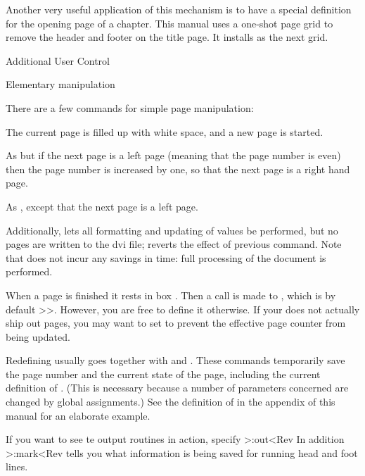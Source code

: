 Another very useful application of this mechanism is to have a
special definition for the opening page of a chapter. This manual uses a
one-shot page grid  to remove the header and footer on the
title page. It installs  as the next grid.

\Section Additional User Control

\SubSection Elementary manipulation

There are a few commands for simple page manipulation:
\Description\item {}
The current page is filled up with white space, and
a new page is started.\item {}
As  but if the next page is a left page (meaning
that the page number is even) then the page number is increased by
one, so that the next page is a right hand page.\item {}
As , except that the next page is a left page.
\>

Additionally,  lets
all formatting and updating of values be performed, but
no pages are written to the dvi file;
reverts the effect of previous command. Note that  does not
incur any savings in time: full processing of the document is performed.
 
When a page is finished it rests in box . Then a call is
made  to , which is by default
\ver>\shipout\box\WholePage>. However, you are free to define it
otherwise. If your  does not actually ship out pages,
you may want to set  to prevent the effective page
counter from being updated.

Redefining  usually goes together with
 and . These commands
temporarily save the page number and the current state of the page,
including the current definition of . (This is necessary
because a number of parameters concerned are changed by global
assignments.) See the definition of  in the appendix of
this manual for an elaborate example. 

If you want to see te output routines in action, specify
\Ver>\Trace:out<Rev In addition \Ver>\Trace:mark<Rev tells you what
information is being saved for running head and foot lines.

\endinput

